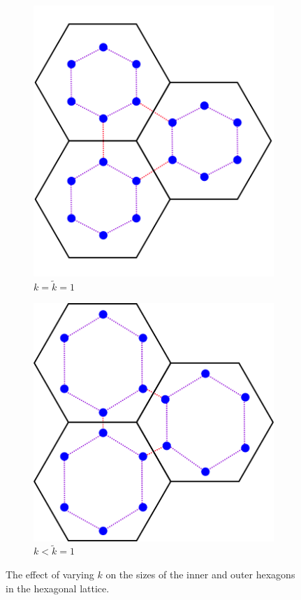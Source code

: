 \begin{figure}[!h]
\begin{subfigure}[b]{.33\textwidth}
  \includegraphics[width=1\linewidth]{imgs/hextug.png}
  \caption{$k=\tilde{k}=1$}
\end{subfigure}%
\begin{subfigure}[b]{.33\textwidth}
  \centering
  \includegraphics[width=1\linewidth]{imgs/hextugbig.png}
  \caption{$k<\tilde{k}=1$}
\end{subfigure}%
\caption{\label{fig:hextug} The effect of varying $k$ on the sizes of the inner
  and outer hexagons in the hexagonal lattice.}
\end{figure}

